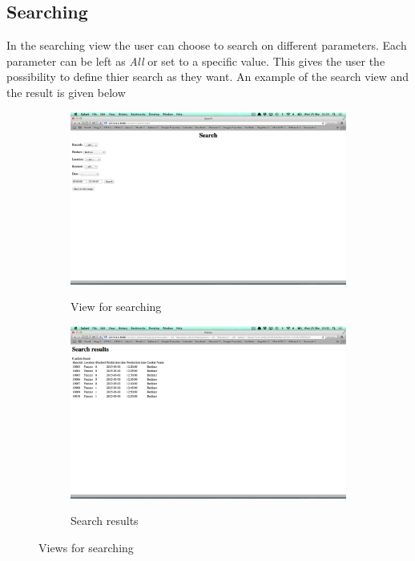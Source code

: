 \documentclass[a4paper]{scrartcl}
\numberwithin{equation}{section}
\begin{document}
\subsection*{Searching}

In the searching view the user can choose to search on different parameters. Each parameter can be left as \emph{All} or set to a specific value. This gives the user the possibility to define thier search as they want. An example of the search view and the result is given below

\begin{figure}[h]
  \centering
  	\begin{subfigure}[b]{0.45\textwidth}
    	\includegraphics[width=\textwidth]{figures/view_search.png}
    	\label{figure:view_search}
    	\caption{View for searching}
 		\end{subfigure}	
 		\begin{subfigure}[b]{0.45\textwidth}
    	\includegraphics[width=\textwidth]{figures/view_searchResult.png}
    	\label{figure:view_searchResult}
    	\caption{Search results}
 		\end{subfigure} 
 		\caption{Views for searching}
\end{figure}
\end{document}
